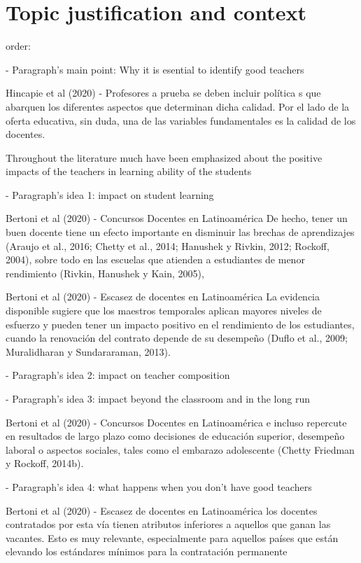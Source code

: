\section{Topic justification and context}

order:

- Paragraph's main point: Why it is esential to identify good teachers

Hincapie et al (2020) - Profesores a prueba
se deben incluir política s que abarquen los diferentes aspectos que determinan dicha calidad. Por el lado de la oferta educativa, sin duda, una de las variables fundamentales es la calidad de los docentes.

Throughout the literature much have been emphasized about the positive impacts of the teachers in learning ability of the students 

- Paragraph's idea 1: impact on student learning

Bertoni et al (2020) - Concursos Docentes en Latinoamérica
De hecho, tener un buen docente tiene un efecto importante en disminuir las brechas de aprendizajes (Araujo et al., 2016; Chetty et al., 2014; Hanushek y Rivkin, 2012; Rockoff, 2004), sobre todo en las escuelas que atienden a estudiantes de menor rendimiento (Rivkin, Hanushek y Kain, 2005),

Bertoni et al (2020) - Escasez de docentes en Latinoamérica
La evidencia disponible sugiere que los maestros temporales aplican mayores niveles de esfuerzo y pueden tener un impacto positivo en el rendimiento de los estudiantes, cuando la renovación del contrato depende de su desempeño (Duflo et al., 2009; Muralidharan y Sundararaman, 2013).


- Paragraph's idea 2: impact on teacher composition

- Paragraph's idea 3: impact beyond the classroom and in the long run

Bertoni et al (2020) - Concursos Docentes en Latinoamérica
 e incluso repercute en resultados de largo plazo como decisiones de educación superior, desempeño laboral o aspectos sociales, tales como el embarazo adolescente
(Chetty Friedman y Rockoff, 2014b).

- Paragraph's idea 4: what happens when you don't have good teachers

Bertoni et al (2020) - Escasez de docentes en Latinoamérica
los docentes contratados por esta vía tienen atributos inferiores a aquellos que ganan las vacantes. Esto es muy relevante, especialmente para aquellos países que están elevando los estándares mínimos para la contratación permanente

